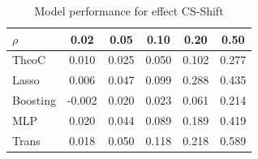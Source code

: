 \documentclass{article}
\begin{document}
\begin{table}[t]\label{table_cs_shift}
    \centering
    \begin{tabular}{lccccc}
\toprule
$\rho$ & 0.02 & 0.05 & 0.10 & 0.20 & 0.50 \\
\midrule
TheoC & {\cellcolor[HTML]{E8D6CC}} \color[HTML]{000000} 0.010 & {\cellcolor[HTML]{6F92F3}} \color[HTML]{F1F1F1} 0.025 & {\cellcolor[HTML]{98B9FF}} \color[HTML]{000000} 0.050 & {\cellcolor[HTML]{7597F6}} \color[HTML]{F1F1F1} 0.102 & {\cellcolor[HTML]{7093F3}} \color[HTML]{F1F1F1} 0.277 \\
Lasso & {\cellcolor[HTML]{B5CDFA}} \color[HTML]{000000} 0.006 & {\cellcolor[HTML]{D65244}} \color[HTML]{F1F1F1} 0.047 & {\cellcolor[HTML]{EE8468}} \color[HTML]{F1F1F1} 0.099 & {\cellcolor[HTML]{B40426}} \color[HTML]{F1F1F1} 0.288 & {\cellcolor[HTML]{F0CDBB}} \color[HTML]{000000} 0.435 \\
Boosting & {\cellcolor[HTML]{3B4CC0}} \color[HTML]{F1F1F1} -0.002 & {\cellcolor[HTML]{3B4CC0}} \color[HTML]{F1F1F1} 0.020 & {\cellcolor[HTML]{3B4CC0}} \color[HTML]{F1F1F1} 0.023 & {\cellcolor[HTML]{3B4CC0}} \color[HTML]{F1F1F1} 0.061 & {\cellcolor[HTML]{3B4CC0}} \color[HTML]{F1F1F1} 0.214 \\
MLP & {\cellcolor[HTML]{B40426}} \color[HTML]{F1F1F1} 0.020 & {\cellcolor[HTML]{EE8468}} \color[HTML]{F1F1F1} 0.044 & {\cellcolor[HTML]{F7AF91}} \color[HTML]{000000} 0.089 & {\cellcolor[HTML]{ECD3C5}} \color[HTML]{000000} 0.189 & {\cellcolor[HTML]{E8D6CC}} \color[HTML]{000000} 0.419 \\
Trans & {\cellcolor[HTML]{D44E41}} \color[HTML]{F1F1F1} 0.018 & {\cellcolor[HTML]{B40426}} \color[HTML]{F1F1F1} 0.050 & {\cellcolor[HTML]{B40426}} \color[HTML]{F1F1F1} 0.118 & {\cellcolor[HTML]{F7AF91}} \color[HTML]{000000} 0.218 & {\cellcolor[HTML]{B40426}} \color[HTML]{F1F1F1} 0.589 \\
\bottomrule
\end{tabular}
\vskip 0.05in
\caption{Model performance for effect CS-Shift}
    \label{table_cs_shift}
    \end{table}
\end{document}

